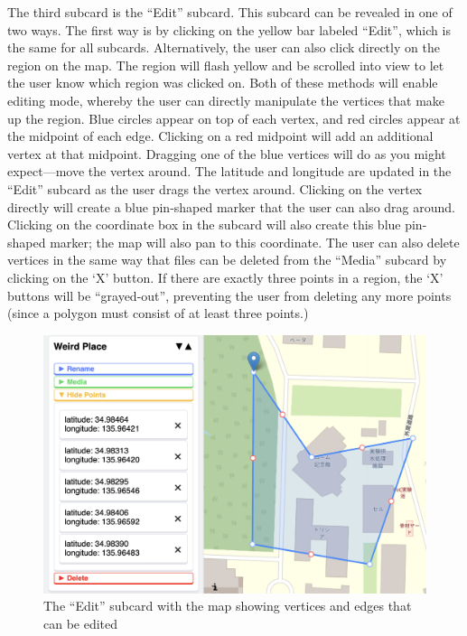 \documentclass[a4paper, 10pt, american, titlepage]{article}
\begin{document}
The third subcard is the ``Edit'' subcard. This subcard can be revealed in one
of two ways. The first way is by clicking on the yellow bar labeled ``Edit'',
which is the same for all subcards. Alternatively, the user can also click
directly on the region on the map. The region will flash yellow and be scrolled
into view to let the user know which region was clicked on. Both of these
methods will enable editing mode, whereby the user can directly manipulate the
vertices that make up the region. Blue circles appear on top of each vertex,
and red circles appear at the midpoint of each edge. Clicking on a red midpoint
will add an additional vertex at that midpoint. Dragging one of the blue
vertices will do as you might expect---move the vertex around. The latitude and
longitude are updated in the ``Edit'' subcard as the user drags the vertex
around. Clicking on the vertex directly will create a blue pin-shaped marker
that the user can also drag around. Clicking on the coordinate box in the
subcard will also create this blue pin-shaped marker; the map will also pan to
this coordinate. The user can also delete vertices in the same way that files
can be deleted from the ``Media'' subcard by clicking on the `X' button. If there
are exactly three points in a region, the `X' buttons will be ``grayed-out'',
preventing the user from deleting any more points (since a polygon must consist
of at least three points.)

\begin{figure}[h]
	\centering
    \includegraphics[width=\textwidth]{edit-subcard-with-map-editour.png}
    \caption{The ``Edit'' subcard with the map showing vertices and edges that
    can be edited}
	\label{fig:editSubcardWithMap}
\end{figure}
\end{document}
